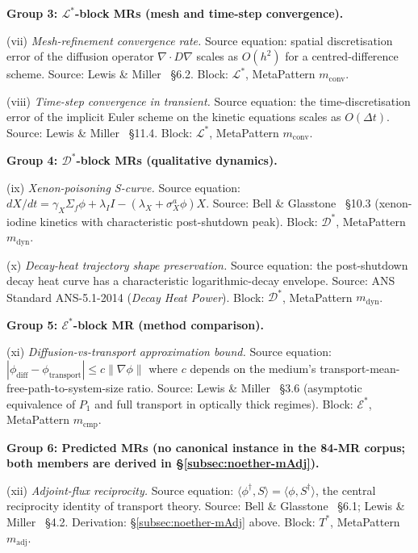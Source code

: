 \noindent\textbf{Group 3: $\mathcal{L}^*$-block MRs (mesh and time-step convergence).}

\noindent (vii) \emph{Mesh-refinement convergence rate.} Source equation: spatial discretisation error of the diffusion operator $\nabla \cdot D \nabla$ scales as $O(h^2)$ for a centred-difference scheme. Source: Lewis \& Miller~\cite{LewisMiller1993} §6.2. Block: $\mathcal{L}^*$, MetaPattern $m_{\mathrm{conv}}$.

\noindent (viii) \emph{Time-step convergence in transient.} Source equation: the time-discretisation error of the implicit Euler scheme on the kinetic equations scales as $O(\Delta t)$. Source: Lewis \& Miller~\cite{LewisMiller1993} §11.4. Block: $\mathcal{L}^*$, MetaPattern $m_{\mathrm{conv}}$.

\noindent\textbf{Group 4: $\mathcal{D}^*$-block MRs (qualitative dynamics).}

\noindent (ix) \emph{Xenon-poisoning S-curve.} Source equation: $dX/dt = \gamma_X \Sigma_f \phi + \lambda_I I - (\lambda_X + \sigma_X^a \phi) X$. Source: Bell \& Glasstone~\cite{BellGlasstone1970} §10.3 (xenon-iodine kinetics with characteristic post-shutdown peak). Block: $\mathcal{D}^*$, MetaPattern $m_{\mathrm{dyn}}$.

\noindent (x) \emph{Decay-heat trajectory shape preservation.} Source equation: the post-shutdown decay heat curve has a characteristic logarithmic-decay envelope. Source: ANS Standard ANS-5.1-2014 (\emph{Decay Heat Power}). Block: $\mathcal{D}^*$, MetaPattern $m_{\mathrm{dyn}}$.

\noindent\textbf{Group 5: $\mathcal{E}^*$-block MR (method comparison).}

\noindent (xi) \emph{Diffusion-vs-transport approximation bound.} Source equation: $|\phi_{\mathrm{diff}} - \phi_{\mathrm{transport}}| \le c \|\nabla \phi\|$ where $c$ depends on the medium's transport-mean-free-path-to-system-size ratio. Source: Lewis \& Miller~\cite{LewisMiller1993} §3.6 (asymptotic equivalence of $P_1$ and full transport in optically thick regimes). Block: $\mathcal{E}^*$, MetaPattern $m_{\mathrm{cmp}}$.

\noindent\textbf{Group 6: Predicted MRs (no canonical instance in the 84-MR corpus; both members are derived in \S\ref{subsec:noether-mAdj}).}

\noindent (xii) \emph{Adjoint-flux reciprocity.} Source equation: $\langle \phi^{\dagger}, S \rangle = \langle \phi, S^{\dagger} \rangle$, the central reciprocity identity of transport theory. Source: Bell \& Glasstone~\cite{BellGlasstone1970} §6.1; Lewis \& Miller~\cite{LewisMiller1993} §4.2. Derivation: §\ref{subsec:noether-mAdj} above. Block: $T^*$, MetaPattern $m_{\mathrm{adj}}$.

